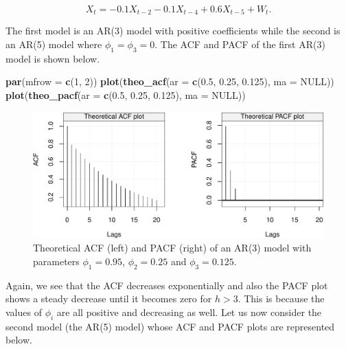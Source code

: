 \documentclass[]{book}
\newenvironment{Shaded}{\begin{snugshade}}{\end{snugshade}}
\newcommand{\KeywordTok}[1]{\textcolor[rgb]{0.13,0.29,0.53}{\textbf{#1}}}
\newcommand{\DataTypeTok}[1]{\textcolor[rgb]{0.13,0.29,0.53}{#1}}
\newcommand{\DecValTok}[1]{\textcolor[rgb]{0.00,0.00,0.81}{#1}}
\newcommand{\FloatTok}[1]{\textcolor[rgb]{0.00,0.00,0.81}{#1}}
\newcommand{\OtherTok}[1]{\textcolor[rgb]{0.56,0.35,0.01}{#1}}
\newcommand{\NormalTok}[1]{#1}
\theoremstyle{definition}
\theoremstyle{definition}
\theoremstyle{definition}
\theoremstyle{remark}
\begin{document}
\[X_t = -0.1 X_{t-2} -0.1 X_{t-4} + 0.6 X_{t-5} + W_t.\]

The first model is an AR(3) model with positive coefficients while the
second is an AR(5) model where \(\phi_1 = \phi_3 = 0\). The ACF and PACF
of the first AR(3) model is shown below.

\begin{Shaded}
\begin{Highlighting}[]
\KeywordTok{par}\NormalTok{(}\DataTypeTok{mfrow =} \KeywordTok{c}\NormalTok{(}\DecValTok{1}\NormalTok{, }\DecValTok{2}\NormalTok{))}
\KeywordTok{plot}\NormalTok{(}\KeywordTok{theo_acf}\NormalTok{(}\DataTypeTok{ar =} \KeywordTok{c}\NormalTok{(}\FloatTok{0.5}\NormalTok{, }\FloatTok{0.25}\NormalTok{, }\FloatTok{0.125}\NormalTok{), }\DataTypeTok{ma =} \OtherTok{NULL}\NormalTok{))}
\KeywordTok{plot}\NormalTok{(}\KeywordTok{theo_pacf}\NormalTok{(}\DataTypeTok{ar =} \KeywordTok{c}\NormalTok{(}\FloatTok{0.5}\NormalTok{, }\FloatTok{0.25}\NormalTok{, }\FloatTok{0.125}\NormalTok{), }\DataTypeTok{ma =} \OtherTok{NULL}\NormalTok{))}
\end{Highlighting}
\end{Shaded}

\begin{figure}

{\centering \includegraphics{ts_files/figure-latex/unnamed-chunk-43-1} 

}

\caption{Theoretical ACF (left) and PACF (right) of an AR(3) model with parameters $\phi_1 = 0.95$, $\phi_2 = 0.25$ and $\phi_3 = 0.125$.}\label{fig:unnamed-chunk-43}
\end{figure}

Again, we see that the ACF decreases exponentially and also the PACF
plot shows a steady decrease until it becomes zero for \(h > 3\). This
is because the values of \(\phi_i\) are all positive and decreasing as
well. Let us now consider the second model (the AR(5) model) whose ACF
and PACF plots are represented below.
\end{document}
